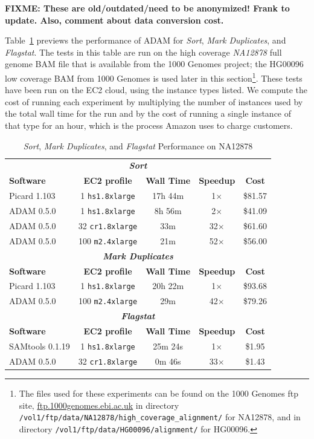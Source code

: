 \documentclass{acm_proc_article-sp}
\begin{document}
\textbf{FIXME: These are old/outdated/need to be anonymized! Frank to update. Also, comment about data conversion cost.}

Table~\ref{tab:overview} previews the performance of ADAM for \textit{Sort}, \textit{Mark Duplicates},
and \textit{Flagstat}. The tests in this table are run on the high coverage \textit{NA12878} full genome
BAM file that is available from the 1000 Genomes project; the HG00096 low coverage BAM from 1000
Genomes is used later in this section\footnote{The files used for these experiments can be found on the
1000 Genomes ftp site, \url{ftp.1000genomes.ebi.ac.uk} in directory
\texttt{/vol1/ftp/data/NA12878/high\_coverage\_alignment/} for NA12878, and in directory
\texttt{/vol1/ftp/data/HG00096/alignment/} for HG00096.}. These tests have been run on the EC2 cloud,
using the instance types listed. We compute the cost of running each experiment by multiplying the
number of instances used by the total wall time for the run and by the cost of running a single instance
of that type for an hour, which is the process Amazon uses to charge customers.

\begin{table}[h]
\caption{\textit{Sort}, \textit{Mark Duplicates}, and \textit{Flagstat} Performance on NA12878}
\label{tab:overview}
\begin{tabular}{ l c c c c }
\hline
\multicolumn{5}{c}{\bf \textit{Sort}} \\
\bf Software & \bf EC2 profile & \bf Wall Time & \bf Speedup & \bf Cost \\
\hline
Picard 1.103 & 1 \texttt{hs1.8xlarge} & 17h 44m & 1$\times$ & \$81.57 \\
ADAM 0.5.0 & 1 \texttt{hs1.8xlarge} & 8h 56m & 2$\times$ & \$41.09 \\
ADAM 0.5.0 & 32 \texttt{cr1.8xlarge} & 33m & 32$\times$ & \$61.60 \\
ADAM 0.5.0 & 100 \texttt{m2.4xlarge} & 21m & 52$\times$ & \$56.00 \\ 
\hline
\multicolumn{5}{c}{\bf \textit{Mark Duplicates}} \\
\bf Software & \bf EC2 profile & \bf Wall Time & \bf Speedup & \bf Cost  \\
\hline
Picard 1.103 & 1 \texttt{hs1.8xlarge} & 20h 22m & 1$\times$ & \$93.68 \\
ADAM 0.5.0 & 100 \texttt{m2.4xlarge} & 29m & 42$\times$ & \$79.26 \\
\hline
\multicolumn{5}{c}{\bf \textit{Flagstat}} \\
\bf Software & \bf EC2 profile & \bf Wall Time & \bf Speedup & \bf Cost  \\
\hline
SAMtools 0.1.19 & 1 \texttt{hs1.8xlarge} & 25m 24s & 1$\times$ & \$1.95 \\
ADAM 0.5.0 & 32 \texttt{cr1.8xlarge} & 0m 46s & 33$\times$ & \$1.43 \\
\hline
\end{tabular}
\end{table}
\end{document}
